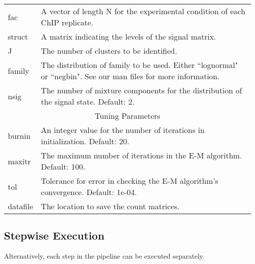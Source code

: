 \documentclass[a4paper,10pt]{article}
\begin{document}
\begin{table}
\begin{tabular}{p{2cm}p{10cm}}
    \hline
    fac & A vector of length N for the experimental condition of each ChIP replicate.\\
    struct & A matrix indicating the levels of the signal matrix. \\
    J & The number of clusters to be identified.\\
    family & The distribution of family to be used.  Either ``lognormal" or ``negbin". See our man files for more information.\\
    nsig & The number of mixture components for the distribution of the signal state. Default: 2.\\
    \hline
    \multicolumn{2}{c}{Tuning Parameters}\\
    \hline
    burnin & An integer value for the number of iterations in initialization. Default: 20.\\
    maxitr & The maximum number of iterations in the E-M algorithm. Default: 100.\\
    tol & Tolerance for error in checking the E-M algorithm's convergence. Default: 1e-04.\\
    datafile & The location to save the count matrices.\\
    \hline
  \end{tabular}
\end{table}

\subsection{Stepwise Execution}

Alternatively, each step in the pipeline can be executed separately.

\begin{Schunk}
\end{Schunk}
\end{document}
